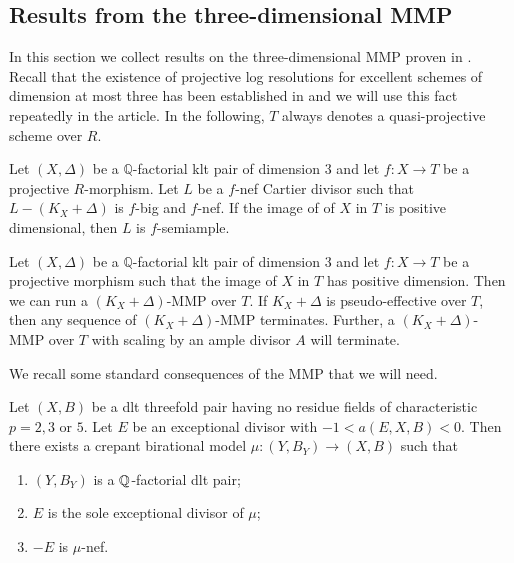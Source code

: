 	\subsection{Results from the three-dimensional MMP}
	
	In this section we collect results on the three-dimensional MMP proven in \cite{bhatt2020}.
	Recall that the existence of projective log resolutions for excellent schemes of dimension at most three has been established in \cite{CP19, CJS20} and we will use this fact repeatedly in the article.
	In the following, $T$ always denotes a quasi-projective scheme over $R$.
	
	
	\begin{theorem} \cite[Theorem G]{bhatt2020} \label{t-bpf}
		Let $(X,\Delta)$ be a $\mathbb{Q}$-factorial klt pair of dimension $3$ and let $f \colon X \to T$ be a projective $R$-morphism. 
		Let $L$ be a $f$-nef Cartier divisor such that $L-(K_{X}+\Delta)$ is $f$-big and $f$-nef.
		If the image of of $X$ in $T$ is positive dimensional, then $L$ is $f$-semiample. 
	\end{theorem}
	
	\begin{theorem} \cite[Theorem F]{bhatt2020} \label{MMP}
		Let $(X,\Delta)$ be a $\mathbb{Q}$-factorial klt pair of dimension $3$ and let $f \colon X \to T$ be a projective morphism such that the image of $X$ in $T$ has positive dimension. 
		Then we can run a $(K_{X}+\Delta)$-MMP over $T$. 
		If $K_{X}+\Delta$ is pseudo-effective over $T$, then any sequence of $(K_X+\Delta)$-MMP terminates. 
		Further, a $(K_X+\Delta)$-MMP over $T$ with scaling by an ample divisor $A$ will terminate.
	\end{theorem}
	We recall some standard consequences of the MMP that we will need.
	\begin{lemma}\label{lemma:extraction}
		Let $(X,B)$ be a dlt threefold pair having no residue fields of characteristic $p=2,3$ or $5$. 
		Let $E$ be an exceptional divisor with $-1<a(E, X, B)<0$. 
		Then there exists a crepant birational model $\mu \colon (Y,B_Y) \to (X,B)$ such that 
		\begin{enumerate}
			\item $(Y,B_Y)$ is a $\mathbb{Q}$-factorial dlt pair;
			\item $E$ is the sole exceptional divisor of $\mu$;
			\item $-E$ is $\mu$-nef.
		\end{enumerate}
	\end{lemma}
	
